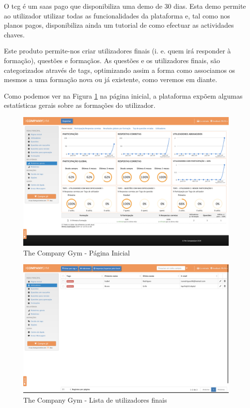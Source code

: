 O \acrshort{tcg} é um \acrshort{saas} pago que disponibiliza uma demo de 30 dias. Esta demo permite ao utilizador utilizar todas as funcionalidades da plataforma e, tal como nos planos pagos, disponibiliza ainda um tutorial de como efectuar as actividades chaves.

Este produto permite-nos criar utilizadores finais (i. e. quem irá responder à formação), questões e formaçãos. As questões e os utilizadores finais, são categorizados através de tags, optimizando assim a forma como associamos os mesmos a uma formação nova ou já existente, como veremos em diante.

 Como podemos ver na Figura \ref{fig:tcg-homepage} na página inicial, a plataforma expõem algumas estatísticas gerais sobre as formações do utilizador.
 
 \newpage


\begin{figure}[ht!]
	\begin{center}
		\includegraphics[width=1\textwidth]{img/tcg/tcg-homepage.png}
		\caption{The Company Gym - Página Inicial}
		\label{fig:tcg-homepage}
	\end{center}
\end{figure}

\begin{figure}[ht!]
	\begin{center}
		\includegraphics[width=1\textwidth]{img/tcg/tcg-utilizadores.png}
		\caption{The Company Gym - Lista de utilizadores finais}
		\label{fig:tcg-utilizadores}
	\end{center}
\end{figure}

